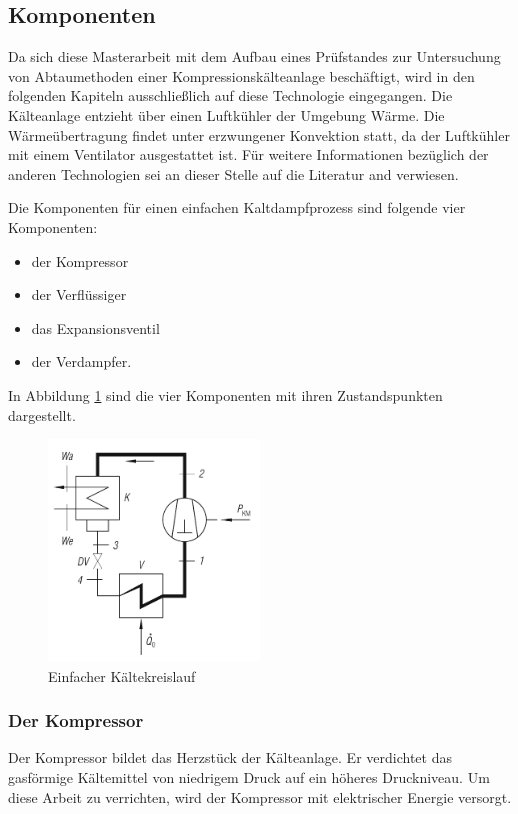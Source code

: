 \newpage
\subsection*{Komponenten}
\label{sec:Kaeltetechnik}


Da sich diese Masterarbeit mit dem Aufbau eines Prüfstandes zur Untersuchung von Abtaumethoden einer Kompressionskälteanlage beschäftigt, wird in den folgenden Kapiteln ausschließlich auf diese Technologie eingegangen. Die Kälteanlage entzieht über einen Luftkühler der Umgebung Wärme. Die Wärmeübertragung findet unter erzwungener Konvektion statt, da der Luftkühler mit einem Ventilator ausgestattet ist. Für weitere Informationen bezüglich der anderen Technologien sei an dieser Stelle auf die Literatur \citep{Baehr2013} and \citep{Grote2014} verwiesen.

Die Komponenten für einen einfachen Kaltdampfprozess  sind folgende vier Komponenten:

\begin{itemize}
\item der Kompressor
\item der Verflüssiger 
\item das Expansionsventil
\item der Verdampfer. 
\end{itemize}

In Abbildung \ref{fig:einfacher Kältekreislauf} sind die vier Komponenten mit ihren Zustandspunkten dargestellt.

\begin{figure}[htb]
\centering		\includegraphics[width=0.50\textwidth]{Pictures/Kaltekreislauf_beahr.png}
\caption{Einfacher Kältekreislauf \citep{Baehr2013}}
\label{fig:einfacher Kältekreislauf}
\end{figure}

\subsubsection*{Der Kompressor}
Der Kompressor bildet das Herzstück der Kälteanlage. Er verdichtet das gasförmige Kältemittel von niedrigem Druck auf ein höheres Druckniveau. Um diese Arbeit zu verrichten, wird der Kompressor mit elektrischer Energie versorgt. %

